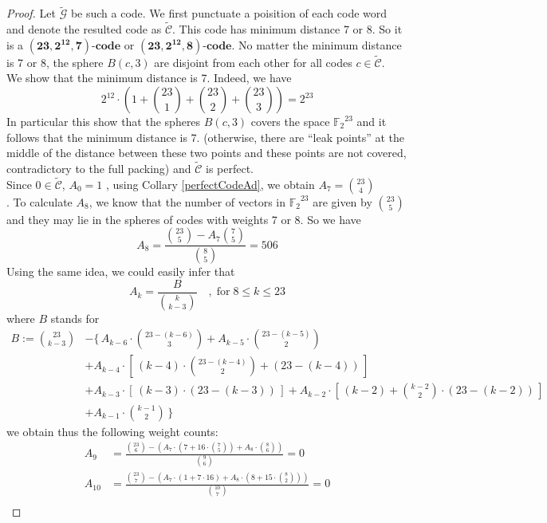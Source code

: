 \documentclass[12pt]{article}
\theoremstyle{definition}
\numberwithin{equation}{theorem}
\numberwithin{figure}{theorem}
\newcommand{\cCodes}{\ensuremath{\widetilde{\mathcal{G}}}}
\newcommand{\tildcCodes}{\ensuremath{\widetilde{\mathcal{C}}}}
\newcommand{\code}[3]{\ensuremath{\bm{(#1,#2,#3)\mbox{-}code}}}
\newcommand{\ftwoN}[1]{\ensuremath{\mathbb{F}_2}^{#1}}
\begin{document}
\begin{proof}
Let {\cCodes} be such a code. We first punctuate a poisition 
of each code word and denote the resulted code as {\tildcCodes}.
This code has minimum distance 7 or 8. So it is a {\code{23}{2^{12}}{7}} or {\code{23}{2^{12}}{8}}. No matter the minimum distance is 7 or 8, the sphere $B(c,3)$ are disjoint from each other for all codes $c \in \tildcCodes$.\\
We show that the minimum distance is 7.  Indeed, we have
\[
	2^{12}\cdot(1 + \binom{23}{1} + \binom{23}{2} + \binom{23}{3}) = 2^{23}
\]
In particular this show that the spheres $B(c,3)$ covers the space {$\ftwoN{23}$} and it follows that the minimum distance is 7. (otherwise, there are ``leak points'' at the middle of the distance between these two points and these points are not covered, contradictory to the full packing) and {\tildcCodes} is perfect.\\
Since $0 \in \tildcCodes$, $A_0 = 1$ , using Collary \ref{perfectCodeAd}, we obtain $A_7 = \binom{23}{4}$\\.
To calculate $A_8$, we know that the number of vectors in $\ftwoN{23}$ are given by $\binom{23}{5}$ and they may lie in the spheres of codes with weights 7 or 8. So we have
\[
	A_8 = \frac{\binom{23}{5} - A_7\binom{7}{5}}{\binom{8}{5}} = 506
\]
Using the same idea, we could easily infer that
\begin{equation}\label{AxEqn}
	A_k = \frac{B}{\binom{k}{k-3}}\quad,\; \mbox{for}\; 8 \leq k \leq 23
\end{equation}
where $B$ stands for
\begin{align*}
B := \binom{23}{k-3} &- \{\,A_{k-6} \cdot \binom{23- (k - 6)}{3} + A_{k - 5} \cdot \binom{23 - (k - 5)}{2}\\ &+ A_{k - 4} \cdot \left[\,(k - 4)\cdot \binom{23 - (k-4)}{2} +
	(23 - (k-4))\,\right] \\&+ A_{k - 3} \cdot \left[\,(k - 3) \cdot (23 - (k - 3))\,\right] + A_{k - 2} \cdot \left[\,(k-2) + \binom{k - 2}{2} \cdot (23 - (k - 2))\,\right]\\ &+ A_{k-1} \cdot \binom{k-1}{2}\,\}
\end{align*}
we obtain thus the following weight counts:
	\begin{align*}
		A_9 &= \frac{\binom{23}{6} - (A_7 \cdot(7 + 16 \cdot \binom{7}{5}) + A_8\cdot \binom{8}{6})}{\binom{9}{6}} = 0\\
		A_{10} &= \frac{\binom{23}{7} - (A_7\cdot(1 + 7\cdot 16) + A_8\cdot(8 + 15 \cdot \binom{8}{2}))}{\binom{10}{7}} = 0 \\

\end{align*}
\end{proof}
\end{document}
